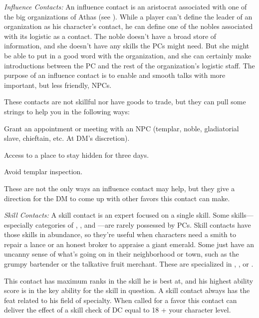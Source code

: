 \textit{Influence Contacts:} An influence contact is an aristocrat associated with one of the big organizations of Athas (see ). While a player can't define the leader of an organization as his character's contact, he can define one of the nobles associated with its logistic as a contact. The noble doesn't have a broad store of information, and she doesn't have any skills the PCs might need. But she might be able to put in a good word with the organization, and she can certainly make introductions between the PC and the rest of the organization's logistic staff. The purpose of an influence contact is to enable and smooth talks with more important, but less friendly, NPCs.

These contacts are not skillful nor have goods to trade, but they can pull some strings to help you in the following ways: 

\begin{itemize*}
\item Grant an appointment or meeting with an NPC (templar, noble, gladiatorial slave, chieftain, etc. At DM's discretion).
\item Access to a place to stay hidden for three days.
\item Avoid templar inspection.
\end{itemize*}

These are not the only ways an influence contact may help, but they give a direction for the DM to come up with other favors this contact can make.

\textit{Skill Contacts:} A skill contact is an expert focused on a single skill. Some skills---especially categories of , , and ---are rarely possessed by PCs. Skill contacts have those skills in abundance, so they're useful when characters need a smith to repair a lance or an honest broker to appraise a giant emerald. Some just have an uncanny sense of what’s going on in their neighborhood or town, such as the grumpy bartender or the talkative fruit merchant. These are specialized in , , or .

This contact has maximum ranks in the skill he is best at, and his highest ability score is in the key ability for the skill in question. A skill contact always has the  feat related to his field of specialty. When called for a favor this contact can deliver the effect of a skill check of DC equal to 18 + \onehalf your character level.

